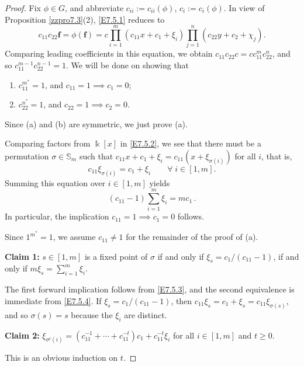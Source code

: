 \documentclass[10pt,a4paper]{amsart}
\newcommand \bff {{\mathbf{f}}}
\newcommand{\SB}{\mathbb{S}}
\begin{document}
\begin{proof}
Fix $\phi \in G$, and abbreviate $c_{ii} := c_{ii}(\phi)$, $c_i := c_i(\phi)$.  In view of Proposition \ref{zzpro7.3}(2), \eqref{E7.5.1} reduces to
\begin{equation}  \label{E7.5.2}  \tag{E7.5.2}
c_{11} c_{22} \bff = \phi(\bff) = c \prod_{i=1}^m (c_{11}x+c_1 +\xi_i) \prod_{j=1}^n (c_{22}y+c_2 + \chi_j).
\end{equation}
Comparing leading coefficients in this equation, we obtain $c_{11} c_{22} c = c c_{11}^m c_{22}^n$, and so $c_{11}^{m-1} c_{22}^{n-1} = 1$.  We will be done on showing that
\begin{enumerate}
\item[(a)]
$c_{11}^{m^*} = 1$, and $c_{11} = 1 \implies c_1 = 0$;
\item[(b)]
$c_{22}^{n^*} = 1$, and $c_{22} = 1 \implies c_2 = 0$.
\end{enumerate}
Since (a) and (b) are symmetric, we just prove (a).

Comparing factors from $\Bbbk[x]$ in \eqref{E7.5.2}, we see that there must be a permutation $\sigma \in \SB_m$ such that $c_{11}x + c_1 + \xi_i = c_{11}(x + \xi_{\sigma(i)})$ for all $i$, that is,
\begin{equation}  \label{E7.5.3}  \tag{E7.5.3}
c_{11} \xi_{\sigma(i)} = c_1 + \xi_i \qquad \forall\; i \in [1,m].
\end{equation}
Summing this equation over $i \in [1,m]$ yields 
\begin{equation}  \label{E7.5.4}  \tag{E7.5.4}
(c_{11}-1) \sum_{i=1}^m \xi_i = m c_1 \,.
\end{equation}
In particular, the implication $c_{11}  = 1 \implies c_1 = 0$ follows.

Since $1^{m^*} = 1$, we assume $c_{11} \ne 1$ for the remainder of the proof of (a).

\textbf{Claim 1:} $s \in [1,m]$ is a fixed point of $\sigma$ if and only if $\xi_s = c_1/(c_{11}-1)$, if and only if $m \xi_s = \sum_{i=1}^m \xi_i$.

The first forward implication follows from \eqref{E7.5.3}, and the second equivalence is immediate from \eqref{E7.5.4}.  If $\xi_s = c_1/(c_{11}-1)$, then $c_{11} \xi_s = c_1 + \xi_s = c_{11} \xi_{\sigma(s)}$, and so $\sigma(s) = s$ because the $\xi_i$ are distinct.

\textbf{Claim 2:} $\xi_{\sigma^t(i)} = (c_{11}^{-1} + \cdots + c_{11}^{-t}) c_1 + c_{11}^{-t} \xi_i$ for all $i \in [1,m]$ and $t \ge 0$.

This is an obvious induction on $t$.


\end{proof}
\end{document}
